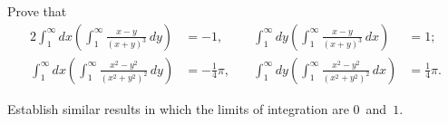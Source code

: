 Prove that
\begin{alignat*}{2}
\int_{1}^{\infty} dx \left(\int_{1}^{\infty} \frac{x - y}{(x + y)^{3}}\, dy\right)
  &= -1, \quad &
\int_{1}^{\infty} dy \left(\int_{1}^{\infty} \frac{x - y}{(x + y)^{3}}\, dx\right)
  &= 1;\\
%
\int_{1}^{\infty} dx \left(\int_{1}^{\infty} \frac{x^{2} - y^{2}}{(x^{2} + y^{2})^{2}}\, dy\right)
  &= -\tfrac{1}{4}\pi, \quad &
\int_{1}^{\infty} dy \left(\int_{1}^{\infty} \frac{x^{2} - y^{2}}{(x^{2} + y^{2})^{2}}\, dx\right)
  &= \tfrac{1}{4}\pi.
\end{alignat*}

Establish similar results in which the limits of integration are $0$~and~$1$.

